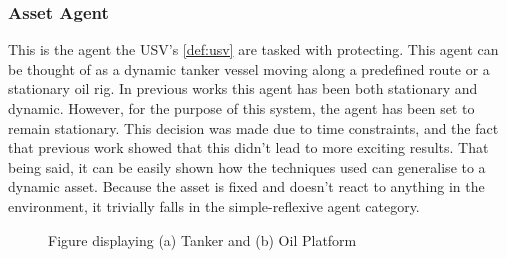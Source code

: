 \documentclass[bsc,frontabs,twoside,singlespacing,parskip,deptreport]{infthesis}     %
\begin{document}
\subsubsection{Asset Agent}
This is the agent the USV's \ref{def:usv} are tasked with protecting. This agent can be thought of as a dynamic tanker vessel moving along a predefined route or a stationary oil rig. In previous works \cite{}\cite{} this agent has been both stationary and dynamic. However, for the purpose of this system, the agent has been set to remain stationary. This decision was made due to time constraints, and the fact that previous work \cite{} showed that this didn't lead to more exciting results. That being said, it can be easily shown how the techniques used can generalise to a dynamic asset. Because the asset is fixed and doesn't react to anything in the environment,  it trivially falls in the simple-reflexive agent category.

\begin{figure}
    \centering
        \centering
    \hfill
    \caption{Figure displaying (a) Tanker \citep{crudepict2005} and (b) Oil Platform \citep{oilpict2005}}
\end{figure}
\end{document}
